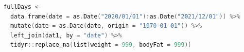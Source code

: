 \begin{lstlisting}[language=c++,label={code:29_03},caption={連続したデータを作り欠損値に借りの値を代入する}]
fullDays <- 
  data.frame(date = as.Date("2020/01/01"):as.Date("2021/12/01")) %>%
  mutate(date = as.Date(date, origin = "1970-01-01")) %>%
  left_join(dat1, by = "date") %>%
  tidyr::replace_na(list(weight = 999, bodyFat = 999))
\end{lstlisting}
